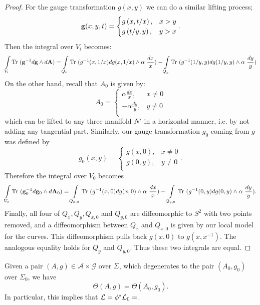 \begin{proof}
		For the gauge transformation $g(x,y)$ we can do a similar lifting process;
		\begin{equation}
			\mathbf{g}(x,y,t) =\begin{cases}
			g\left(x,t/x\right), & x>y\\
			g\left(t/y,y\right), & y>x\\
			\end{cases}.
		\end{equation}
		Then the integral over $V_i$ becomes:
		\begin{align*}
			\int\limits_{V_i} \text{Tr }(\mathbf{g}^{-1}d\mathbf{g}\wedge d\mathbf{A}) = \int\limits_{Q_x} \text{Tr }(g^{-1}(x,1/x)dg(x,1/x)\wedge \alpha~ \frac{dx}{x}) - \int\limits_{Q_y} \text{Tr }(g^{-1}(1/y,y)dg(1/y,y)\wedge \alpha~ \frac{dy}{y})
		\end{align*}
		On the other hand, recall that $A_0$ is given by:
		\begin{equation}
			A_0 = \begin{cases}
			\alpha \frac{dx}{x}, & x\neq 0\\
			-\alpha \frac{dy}{y}, & y\neq 0\\
			\end{cases}
		\end{equation}
		which can be lifted to any three manifold $N'$ in a horizontal manner, i.e. by not adding any tangential part. Similarly, our gauge transformation $g_0$ coming from $g$ was defined by 
		\begin{equation}
		g_0(x,y) =\begin{cases}
		g\left(x,0\right), & x\neq 0\\
		g\left(0,y\right), & y \neq 0 \\
		\end{cases}.
		\end{equation}
		Therefore the integral over $V_0$ becomes
		\begin{align*}
		\int\limits_{V_0} \text{Tr }(\mathbf{g}_0^{-1}d\mathbf{g}_0\wedge d\mathbf{A}_0) = \int\limits_{Q_{x,0}} \text{Tr }(g^{-1}(x,0)dg(x,0)\wedge \alpha~ \frac{dx}{x}) - \int\limits_{Q_{y,0}} \text{Tr }(g^{-1}(0,y)dg(0,y)\wedge \alpha~ \frac{dy}{y}).
		\end{align*}
		Finally, all four of $Q_x,Q_y, Q_{x,0}$ and $Q_{y,0}$ are diffeomorphic to $S^2$ with two points removed, and a diffeomorphism between $Q_x$ and $Q_{x,0}$ is given by our local model for the curves. This diffeomorphism pulls back $g(x,0)$ to $g(x,x^{-1})$. The analogous equality holds for $Q_y$ and $Q_{y,0}$. Thus these two integrals are equal.
	\end{proof}
	\begin{theorem}
		Given a pair $(A,g) \in \mathcal{A}\times\mathcal{G}$ over $\Sigma$, which degenerates to the pair $(A_0, g_0)$ over $\Sigma_0$, we have
		\begin{equation}
			\Theta(A,g) = \Theta(A_0, g_0).
		\end{equation}
		In particular, this implies that $\mathcal{L} = \phi^\ast \mathcal{L}_0 =$.
		\label{t:l=l0}
	\end{theorem}
